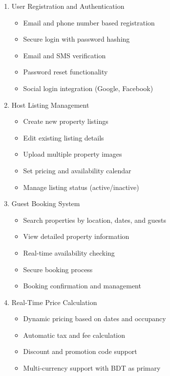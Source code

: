 \documentclass[12pt,a4paper]{report}
\begin{document}
\begin{enumerate}
    \item User Registration and Authentication
    \begin{itemize}
        \item Email and phone number based registration
        \item Secure login with password hashing
        \item Email and SMS verification
        \item Password reset functionality
        \item Social login integration (Google, Facebook)
    \end{itemize}
    
    \item Host Listing Management
    \begin{itemize}
        \item Create new property listings
        \item Edit existing listing details
        \item Upload multiple property images
        \item Set pricing and availability calendar
        \item Manage listing status (active/inactive)
    \end{itemize}
    
    \item Guest Booking System
    \begin{itemize}
        \item Search properties by location, dates, and guests
        \item View detailed property information
        \item Real-time availability checking
        \item Secure booking process
        \item Booking confirmation and management
    \end{itemize}
    
    \item Real-Time Price Calculation
    \begin{itemize}
        \item Dynamic pricing based on dates and occupancy
        \item Automatic tax and fee calculation
        \item Discount and promotion code support
        \item Multi-currency support with BDT as primary
    \end{itemize}
    

\end{enumerate}
\end{document}
